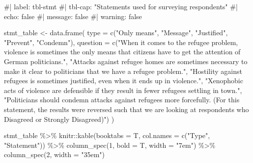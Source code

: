 \documentclass[
]{article}
\newenvironment{Shaded}{\begin{snugshade}}{\end{snugshade}}
\newcommand{\AttributeTok}[1]{\textcolor[rgb]{0.40,0.45,0.13}{#1}}
\newcommand{\CommentTok}[1]{\textcolor[rgb]{0.37,0.37,0.37}{#1}}
\newcommand{\DecValTok}[1]{\textcolor[rgb]{0.68,0.00,0.00}{#1}}
\newcommand{\FunctionTok}[1]{\textcolor[rgb]{0.28,0.35,0.67}{#1}}
\newcommand{\NormalTok}[1]{\textcolor[rgb]{0.00,0.23,0.31}{#1}}
\newcommand{\OtherTok}[1]{\textcolor[rgb]{0.00,0.23,0.31}{#1}}
\newcommand{\SpecialCharTok}[1]{\textcolor[rgb]{0.37,0.37,0.37}{#1}}
\newcommand{\StringTok}[1]{\textcolor[rgb]{0.13,0.47,0.30}{#1}}
\begin{document}
\begin{Shaded}
\begin{Highlighting}[]
\CommentTok{\#| label: tbl{-}stmt}
\CommentTok{\#| tbl{-}cap: "Statements used for surveying respondents"}
\CommentTok{\#| echo: false}
\CommentTok{\#| message: false}
\CommentTok{\#| warning: false}

\NormalTok{stmt\_table }\OtherTok{\textless{}{-}} \FunctionTok{data.frame}\NormalTok{(}
  \AttributeTok{type =} \FunctionTok{c}\NormalTok{(}\StringTok{"Only means"}\NormalTok{, }\StringTok{"Message"}\NormalTok{, }\StringTok{"Justified"}\NormalTok{, }\StringTok{"Prevent"}\NormalTok{, }\StringTok{"Condemn"}\NormalTok{),}
  \AttributeTok{question =} \FunctionTok{c}\NormalTok{(}\StringTok{"When it comes to the refugee problem, violence is sometimes the only means that citizens have to get the attention of German politicians."}\NormalTok{, }
               \StringTok{"Attacks against refugee homes are sometimes necessary to make it clear to politicians that we have a refugee problem."}\NormalTok{,}
               \StringTok{"Hostility against refugees is sometimes justified, even when it ends up in violence."}\NormalTok{,}
               \StringTok{"Xenophobic acts of violence are defensible if they result in fewer refugees settling in town."}\NormalTok{, }
               \StringTok{"Politicians should condemn attacks against refugees more forcefully. (For this statement, the results were reversed such that we are looking at respondents who Disagreed or Strongly Disagreed)"}\NormalTok{)}
\NormalTok{)}

\NormalTok{stmt\_table }\SpecialCharTok{\%\textgreater{}\%} 
\NormalTok{  knitr}\SpecialCharTok{::}\FunctionTok{kable}\NormalTok{(}\AttributeTok{booktabs =}\NormalTok{ T, }\AttributeTok{col.names =} \FunctionTok{c}\NormalTok{(}\StringTok{"Type"}\NormalTok{, }\StringTok{"Statement"}\NormalTok{)) }\SpecialCharTok{\%\textgreater{}\%} 
  \FunctionTok{column\_spec}\NormalTok{(}\DecValTok{1}\NormalTok{, }\AttributeTok{bold =}\NormalTok{ T, }\AttributeTok{width =} \StringTok{"7em"}\NormalTok{) }\SpecialCharTok{\%\textgreater{}\%}
  \FunctionTok{column\_spec}\NormalTok{(}\DecValTok{2}\NormalTok{, }\AttributeTok{width =} \StringTok{"35em"}\NormalTok{)}
\end{Highlighting}
\end{Shaded}
\end{document}
